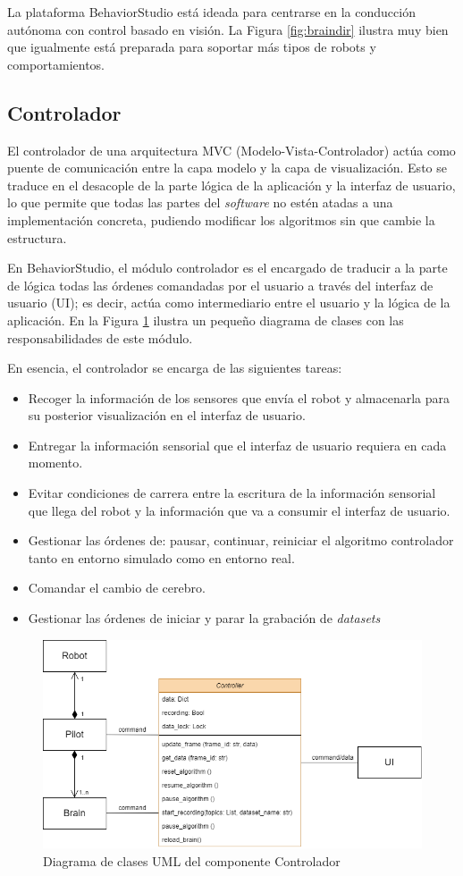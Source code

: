 La plataforma BehaviorStudio está ideada para centrarse en la conducción autónoma con control basado en visión. La Figura \ref{fig:braindir} ilustra muy bien que igualmente está preparada para soportar más tipos de robots y comportamientos.

\subsection{Controlador}
\label{sec:controller}

El controlador de una arquitectura MVC (Modelo-Vista-Controlador) actúa como puente de comunicación entre la capa modelo y la capa de visualización. Esto se traduce en el desacople de la parte lógica de la aplicación y la interfaz de usuario, lo que permite que todas las partes del \textit{software} no estén atadas a una implementación concreta, pudiendo modificar los algoritmos sin que cambie la estructura. 

En BehaviorStudio, el módulo controlador es el encargado de traducir a la parte de lógica todas las órdenes comandadas por el usuario a través del interfaz de usuario (UI); es decir, actúa como intermediario entre el usuario y la lógica de la aplicación. En la Figura \ref{fig:controluml} ilustra un pequeño diagrama de clases con las responsabilidades de este módulo. 

\noindent En esencia, el controlador se encarga de las siguientes tareas:

\begin{itemize}
    \item Recoger la información de los sensores que envía el robot y almacenarla para su posterior visualización en el interfaz de usuario.
    \item Entregar la información sensorial que el interfaz de usuario requiera en cada momento.
    \item Evitar condiciones de carrera entre la escritura de la información sensorial que llega del robot y la información que va a consumir el interfaz de usuario.
    \item Gestionar las órdenes de: pausar, continuar, reiniciar el algoritmo controlador tanto en entorno simulado como en entorno real.
    \item Comandar el cambio de cerebro.
    \item Gestionar las órdenes de iniciar y parar la grabación de \textit{datasets}
\end{itemize}

\begin{figure}
  \centering
  \includegraphics[width=.7\linewidth]{img/controlleruml}
  \caption{Diagrama de clases UML del componente Controlador}
  \label{fig:controluml}
\end{figure}

